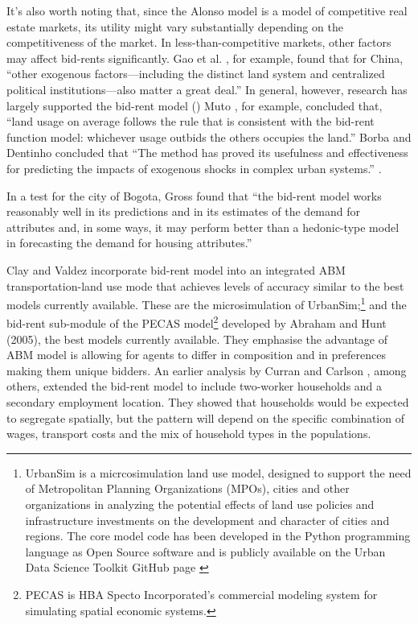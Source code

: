 It's also worth noting that, since the Alonso model is  a model of competitive real estate markets, its utility might vary substantially depending on the competitiveness of the market.  In less-than-competitive markets, other factors may affect bid-rents significantly. %
Gao et al. \cite{GaoJinlong2020BtbT}, for example,  found  that for China, ``other exogenous  factors---including the distinct land system  and centralized political institutions---also matter a great deal.'' In general, however, 
research has largely supported the bid-rent model (\cite{mutoEstimationBidRent2006, wheatonBidRentApproach1977}) Muto \cite{mutoEstimationBidRent2006}, for example, concluded that,  ``land usage on average follows the rule that is consistent with the bid-rent function model: whichever usage outbids the others occupies the land.''  Borba and Dentinho concluded that ``The method has proved its usefulness and effectiveness for predicting the impacts of exogenous shocks in complex urban systems.'' \cite{borbaEvaluationUrbanScenarios2016}.  

In a test for the city of Bogota, Gross \cite{grossEstimatingWillingnessPay1988} found that ``the bid-rent model works reasonably well in its predictions and in its estimates of the demand for attributes and, in some ways, it may perform better than a hedonic-type model in forecasting the demand for housing attributes.'' 

Clay and Valdez incorporate bid-rent model into an integrated ABM transportation-land use mode that achieves levels of accuracy similar to the best models currently available. These are the microsimulation of UrbanSim;\footnote{UrbanSim is a micrcosimulation land use model, designed to support the need of Metropolitan Planning Organizations (MPOs), cities and other organizations in analyzing the potential effects of land use policies and infrastructure investments on the development and character of cities and regions. The core model code has been developed in the Python programming language as Open Source software and is publicly available on the Urban Data Science Toolkit GitHub page \cite{waddellmodellinurbandev2002}} and the bid-rent sub-module of the PECAS model\footnote{PECAS is  HBA Specto Incorporated's commercial modeling system  for simulating spatial economic systems.} developed by Abraham and Hunt (2005), the best models currently available. They emphasise the advantage of ABM model is allowing for agents to differ in composition and in preferences making them unique bidders. 
An earlier analysis by Curran and Carlson \cite{curranTheoryResidentialLocation1982}, among others, extended the bid-rent model to include two-worker households and a secondary employment location. They showed that households would be expected to segregate spatially, but the pattern will depend on the specific combination of wages, transport costs and the mix of household types in the populations. 

